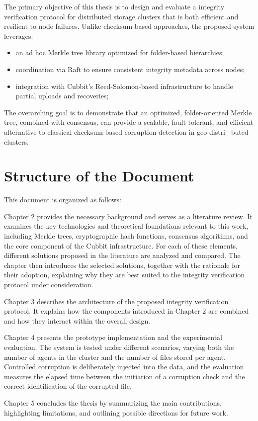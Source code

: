 The primary objective of this thesis is to design and evaluate a integrity verification protocol for distributed storage clusters that is both efficient and resilient to node failures. Unlike checksum-based approaches, the proposed system leverages:
\begin{itemize}
	\item an ad hoc Merkle tree library optimized for folder-based hierarchies;
	\item coordination via Raft to ensure consistent integrity
	      metadata across nodes;
	\item integration with Cubbit's Reed-Solomon-based infrastructure to handle partial uploads and recoveries;
\end{itemize}

The overarching goal is to demonstrate that an optimized, folder-oriented Merkle
tree, combined with consensus, can provide a scalable, fault-tolerant, and
efficient alternative to classical checksum-based corruption detection in
geo-distri-\ buted clusters.


\section{Structure of the Document}

This document is organized as follows:

Chapter 2 provides the necessary background and serves as a literature review. It examines the key technologies and theoretical foundations relevant to this work, including Merkle trees, cryptographic hash functions, consensus algorithms, and the core component of the Cubbit infrastructure. For each of these elements, different solutions proposed in the literature are analyzed and compared. The chapter then introduces the selected solutions, together with the rationale for their adoption, explaining why they are best suited to the integrity verification protocol under consideration.

Chapter 3 describes the architecture of the proposed integrity verification protocol. It explains how the components introduced in Chapter 2 are combined and how they interact within the overall design.

Chapter 4 presents the prototype implementation and the experimental evaluation. The system is tested under different scenarios, varying both the number of agents in the cluster and the number of files stored per agent. Controlled corruption is deliberately injected into the data, and the evaluation measures the elapsed time between the initiation of a corruption check and the correct identification of the corrupted file.

Chapter 5 concludes the thesis by summarizing the main contributions, highlighting limitations, and outlining possible directions for future work.
